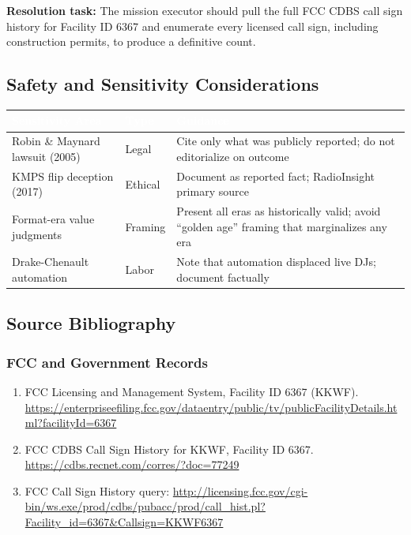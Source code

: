 \documentclass[11pt,letterpaper]{article}
\newcommand{\tableheader}[1]{\textbf{\sffamily\textcolor{white}{#1}}}
\begin{document}
\textbf{Resolution task:} The mission executor should pull the full FCC CDBS call sign history for Facility ID 6367 and enumerate every licensed call sign, including construction permits, to produce a definitive count.

\subsection{Safety and Sensitivity Considerations}

\begin{center}
\begin{tabularx}{\textwidth}{L{3cm}L{2cm}X}
\toprule
{}
\tableheader{Sensitivity Area} & \tableheader{Type} & \tableheader{Guidance} \\
\midrule
Robin \& Maynard lawsuit (2005) & Legal & Cite only what was publicly reported; do not editorialize on outcome \\
KMPS flip deception (2017) & Ethical & Document as reported fact; RadioInsight primary source \\
Format-era value judgments & Framing & Present all eras as historically valid; avoid ``golden age'' framing that marginalizes any era \\
Drake-Chenault automation & Labor & Note that automation displaced live DJs; document factually \\
\bottomrule
\end{tabularx}
\end{center}

\subsection{Source Bibliography}

\subsubsection{FCC and Government Records}
\begin{enumerate}[leftmargin=2em]
  \item FCC Licensing and Management System, Facility ID 6367 (KKWF). \url{https://enterpriseefiling.fcc.gov/dataentry/public/tv/publicFacilityDetails.html?facilityId=6367}
  \item FCC CDBS Call Sign History for KKWF, Facility ID 6367. \url{https://cdbs.recnet.com/corres/?doc=77249}
  \item FCC Call Sign History query: \url{http://licensing.fcc.gov/cgi-bin/ws.exe/prod/cdbs/pubacc/prod/call_hist.pl?Facility_id=6367\&Callsign=KKWF6367}
\end{enumerate}
\end{document}
